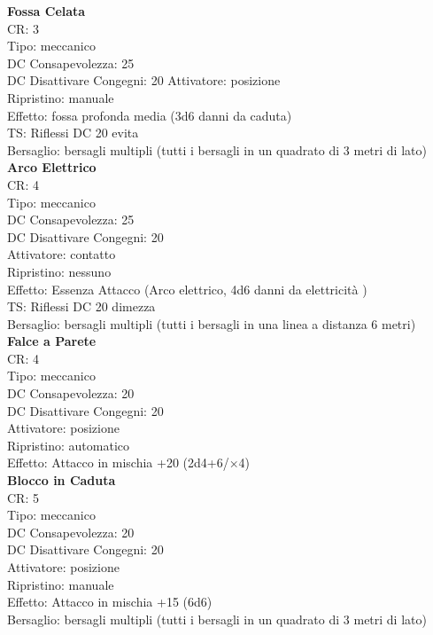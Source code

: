 \documentclass[a4paper,11pt,twoside,openany]{book}
\begin{document}
\begin{multicols}{2}
	\textbf{Fossa Celata}\\
	CR: 3 \\
	Tipo: meccanico \\
	DC Consapevolezza: 25 \\
	DC Disattivare Congegni: 20
	Attivatore: posizione \\
	Ripristino: manuale \\
	Effetto: fossa profonda media (3d6 danni da caduta) \\
	TS: Riflessi DC 20 evita \\
	Bersaglio: bersagli multipli (tutti i bersagli in un quadrato di 3 metri di lato)\\

	\textbf{Arco Elettrico}\\
	CR: 4 \\
	Tipo: meccanico \\
	DC Consapevolezza: 25 \\
	DC Disattivare Congegni: 20 \\
	Attivatore: contatto \\
	Ripristino: nessuno \\
	Effetto: Essenza Attacco (Arco elettrico, 4d6 danni da elettricità )\\
	TS: Riflessi DC 20 dimezza \\
	Bersaglio: bersagli multipli (tutti i bersagli in una linea a distanza 6 metri)\\

	\textbf{Falce a Parete}\\
	CR: 4 \\
	Tipo: meccanico \\
	DC Consapevolezza: 20 \\
	DC Disattivare Congegni: 20 \\
	Attivatore: posizione \\
	Ripristino: automatico \\
	Effetto: Attacco in mischia +20 (2d4+6/×4)\\

	\textbf{Blocco in Caduta}\\
	CR: 5 \\
	Tipo: meccanico \\
	DC Consapevolezza: 20 \\
	DC Disattivare Congegni: 20 \\
	Attivatore: posizione \\
	Ripristino: manuale \\
	Effetto: Attacco in mischia +15 (6d6) \\
	Bersaglio: bersagli multipli (tutti i bersagli in un quadrato di 3 metri di lato)\\


\end{multicols}
\end{document}
